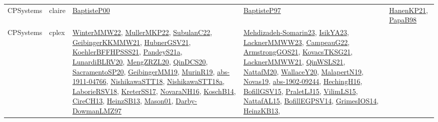 {\begin{longtable}{lp{3cm}>{\raggedright}p{6cm}>{\raggedright}p{6cm}p{8cm}}
CPSystems & claire & \href{articles/BaptisteP00.pdf}{BaptisteP00}\cite{BaptisteP00} & \href{papers/BaptisteP97.pdf}{BaptisteP97}\cite{BaptisteP97} & \href{papers/HanenKP21.pdf}{HanenKP21}\cite{HanenKP21}, \href{articles/PapaB98.pdf}{PapaB98}\cite{PapaB98}\\
CPSystems & cplex & \href{papers/WinterMMW22.pdf}{WinterMMW22}\cite{WinterMMW22}, \href{articles/MullerMKP22.pdf}{MullerMKP22}\cite{MullerMKP22}, \href{articles/SubulanC22.pdf}{SubulanC22}\cite{SubulanC22}, \href{papers/GeibingerKKMMW21.pdf}{GeibingerKKMMW21}\cite{GeibingerKKMMW21}, \href{articles/HubnerGSV21.pdf}{HubnerGSV21}\cite{HubnerGSV21}, \href{articles/KoehlerBFFHPSSS21.pdf}{KoehlerBFFHPSSS21}\cite{KoehlerBFFHPSSS21}, \href{articles/PandeyS21a.pdf}{PandeyS21a}\cite{PandeyS21a}, \href{articles/LunardiBLRV20.pdf}{LunardiBLRV20}\cite{LunardiBLRV20}, \href{articles/MengZRZL20.pdf}{MengZRZL20}\cite{MengZRZL20}, \href{articles/QinDCS20.pdf}{QinDCS20}\cite{QinDCS20}, \href{articles/SacramentoSP20.pdf}{SacramentoSP20}\cite{SacramentoSP20}, \href{papers/GeibingerMM19.pdf}{GeibingerMM19}\cite{GeibingerMM19}, \href{papers/MurinR19.pdf}{MurinR19}\cite{MurinR19}, \href{articles/abs-1911-04766.pdf}{abs-1911-04766}\cite{abs-1911-04766}, \href{papers/NishikawaSTT18.pdf}{NishikawaSTT18}\cite{NishikawaSTT18}, \href{papers/NishikawaSTT18a.pdf}{NishikawaSTT18a}\cite{NishikawaSTT18a}, \href{articles/LaborieRSV18.pdf}{LaborieRSV18}\cite{LaborieRSV18}, \href{articles/KreterSS17.pdf}{KreterSS17}\cite{KreterSS17}, \href{articles/NovaraNH16.pdf}{NovaraNH16}\cite{NovaraNH16}, \href{papers/KoschB14.pdf}{KoschB14}\cite{KoschB14}, \href{papers/CireCH13.pdf}{CireCH13}\cite{CireCH13}, \href{articles/HeinzSB13.pdf}{HeinzSB13}\cite{HeinzSB13}, \href{articles/Mason01.pdf}{Mason01}\cite{Mason01}, \href{articles/Darby-DowmanLMZ97.pdf}{Darby-DowmanLMZ97}\cite{Darby-DowmanLMZ97} & \href{papers/Mehdizadeh-Somarin23.pdf}{Mehdizadeh-Somarin23}\cite{Mehdizadeh-Somarin23}, \href{articles/IsikYA23.pdf}{IsikYA23}\cite{IsikYA23}, \href{articles/LacknerMMWW23.pdf}{LacknerMMWW23}\cite{LacknerMMWW23}, \href{articles/CampeauG22.pdf}{CampeauG22}\cite{CampeauG22}, \href{papers/ArmstrongGOS21.pdf}{ArmstrongGOS21}\cite{ArmstrongGOS21}, \href{papers/KovacsTKSG21.pdf}{KovacsTKSG21}\cite{KovacsTKSG21}, \href{papers/LacknerMMWW21.pdf}{LacknerMMWW21}\cite{LacknerMMWW21}, \href{articles/QinWSLS21.pdf}{QinWSLS21}\cite{QinWSLS21}, \href{papers/NattafM20.pdf}{NattafM20}\cite{NattafM20}, \href{articles/WallaceY20.pdf}{WallaceY20}\cite{WallaceY20}, \href{papers/MalapertN19.pdf}{MalapertN19}\cite{MalapertN19}, \href{articles/Novas19.pdf}{Novas19}\cite{Novas19}, \href{articles/abs-1902-09244.pdf}{abs-1902-09244}\cite{abs-1902-09244}, \href{papers/HechingH16.pdf}{HechingH16}\cite{HechingH16}, \href{papers/BofillGSV15.pdf}{BofillGSV15}\cite{BofillGSV15}, \href{papers/PraletLJ15.pdf}{PraletLJ15}\cite{PraletLJ15}, \href{papers/VilimLS15.pdf}{VilimLS15}\cite{VilimLS15}, \href{articles/NattafAL15.pdf}{NattafAL15}\cite{NattafAL15}, \href{papers/BofillEGPSV14.pdf}{BofillEGPSV14}\cite{BofillEGPSV14}, \href{articles/GrimesIOS14.pdf}{GrimesIOS14}\cite{GrimesIOS14}, \href{papers/HeinzKB13.pdf}{HeinzKB13}\cite{HeinzKB13}, 
\end{longtable}}
